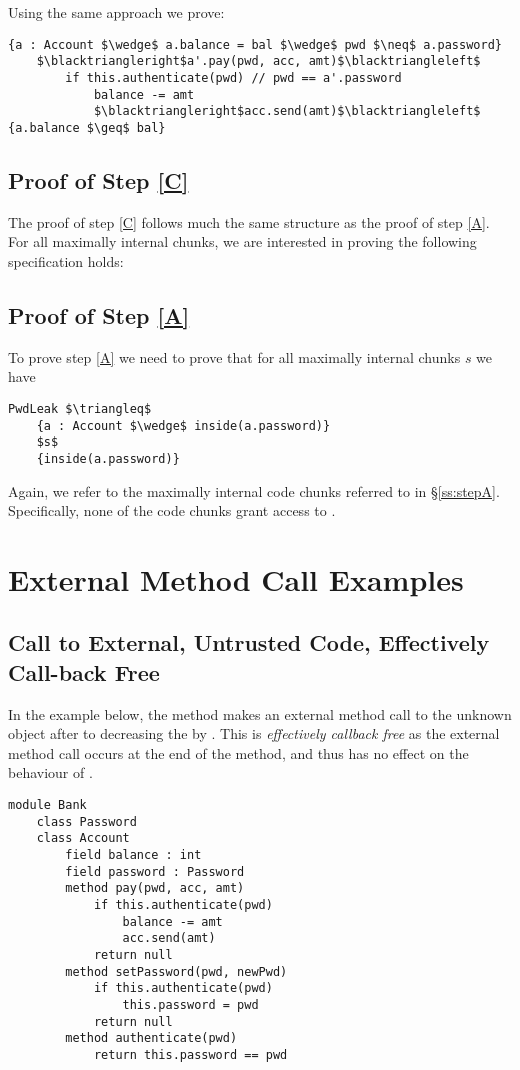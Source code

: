 \documentclass[11pt]{article} %
\theoremstyle{definition}
\begin{document}
Using the same approach we prove:
\begin{lstlisting}[language = Chainmail, frame  = lines, mathescape = true]
{a : Account $\wedge$ a.balance = bal $\wedge$ pwd $\neq$ a.password}
	$\blacktriangleright$a'.pay(pwd, acc, amt)$\blacktriangleleft$
		if this.authenticate(pwd) // pwd == a'.password
			balance -= amt
			$\blacktriangleright$acc.send(amt)$\blacktriangleleft$
{a.balance $\geq$ bal}
\end{lstlisting}

\subsection{Proof of Step \ref{C}}
The proof of step \ref{C} follows much the same structure as the proof of step \ref{A}. For all maximally internal chunks, we are interested 
in proving the following specification holds:
\subsection{Proof of Step \ref{A}}
To prove step \ref{A} we need to prove that for all maximally internal chunks $s$ we have
\begin{lstlisting}[language = Chainmail, frame = lines, mathescape = true]
PwdLeak $\triangleq$
	{a : Account $\wedge$ inside(a.password)}
	$s$
	{inside(a.password)}
\end{lstlisting}
Again, we refer to the maximally internal code chunks referred to in \S \ref{ss:stepA}.
Specifically, none of the code chunks grant access to .
 
\section{External Method Call Examples}
\subsection{Call to External, Untrusted Code, Effectively Call-back Free}
\label{s:ex1}
In the example below, the  method makes an external method call  to the unknown object 
after to decreasing the  by . This is \emph{effectively callback free} as the external method 
call occurs at the end of the method, and thus  has no effect on the behaviour of .
\begin{lstlisting}[language = Chainmail, mathescape=true, frame=lines]
module Bank
	class Password
	class Account
		field balance : int
		field password : Password
		method pay(pwd, acc, amt)
			if this.authenticate(pwd)
				balance -= amt
				acc.send(amt)
			return null
		method setPassword(pwd, newPwd)
			if this.authenticate(pwd)
				this.password = pwd
			return null
		method authenticate(pwd)
			return this.password == pwd
\end{lstlisting}
\end{document}
